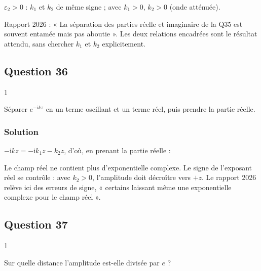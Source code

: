 \documentclass[11pt,a4paper]{article}
\newcommand{\equationajustee}[1]{%
  \sbox{\boiteequation}{$\displaystyle #1$}%
  \ifdim\wd\boiteequation>\linewidth
    \[\resizebox{\linewidth}{!}{\usebox{\boiteequation}}\]%
  \else
    \[#1\]%
  \fi}
\begin{document}
\(\varepsilon_2>0\) : \(k_1\) et \(k_2\) de même signe ; avec \(k_1>0\), \(k_2>0\) (onde atténuée).

\begin{jury}

Rapport 2026 : « La séparation des parties réelle et imaginaire de la Q35 est souvent entamée mais pas aboutie ». Les deux relations encadrées sont le résultat attendu, sans chercher \(k_1\) et \(k_2\) explicitement.

\end{jury}

\hypertarget{question-36}{%
\subsection{Question 36}\label{question-36}}

\begin{indication}{1}

Séparer \(e^{-\mathrm{i}kz}\) en un terme oscillant et un terme réel, puis prendre la partie réelle.

\end{indication}

\hypertarget{solution-35}{%
\subsubsection{Solution}\label{solution-35}}

\(-\mathrm{i}kz=-\mathrm{i}k_1z-k_2z\), d'où, en prenant la partie réelle :

\equationajustee{\boxed{\vec E=E_{\mathrm{o}}e^{-k_2z}\cos(\omega t-k_1z)\vec u_x}}

\begin{piege}

Le champ réel ne contient plus d'exponentielle complexe. Le signe de l'exposant réel se contrôle : avec \(k_2>0\), l'amplitude doit décroître vers \(+z\). Le rapport 2026 relève ici des erreurs de signe, « certains laissant même une exponentielle complexe pour le champ réel ».

\end{piege}

\hypertarget{question-37}{%
\subsection{Question 37}\label{question-37}}

\begin{indication}{1}

Sur quelle distance l'amplitude est-elle divisée par \(e\) ?

\end{indication}
\end{document}
